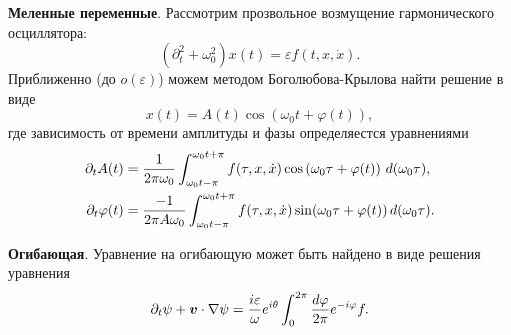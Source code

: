 \textbf{Меленные переменные}. Рассмотрим прозвольное возмущение гармонического осциллятора:
\begin{equation}
    \left(\partial_t^2 + \omega_0^2\right) x(t) = \varepsilon f(t, x, \dot{x}).
    \label{sloweq}
\end{equation}
Приближенно (до $o(\varepsilon)$) можем методом Боголюбова-Крылова найти
решение в виде
\begin{equation}
    x(t) = A(t) \cos(\omega_0 t + \varphi(t)),
    \label{sloweqview}
\end{equation}
где зависимость от времени амплитуды и фазы определяестся уравнениями
\begin{align}
    \partial_t A(t) &= \frac{1}{2\pi \omega_0}\int_{\omega_0 t-\pi}^{\omega_0 t+\pi} f(\tau, x, \dot{x}) \cos\left(\omega_0 \tau + \varphi(t)\right) \, d (\omega_0\tau), 
    \label{slowA}
    \\
    \partial_t \varphi(t) &= \frac{-1}{2 \pi A \omega_0} \int_{\omega_0 t-\pi}^{\omega_0 t + \pi} f(\tau, x, \dot{x}) \sin(\omega_0 \tau + \varphi(t)) \, d (\omega_0 \tau).
    \label{slowphi}
\end{align}

\textbf{Огибающая}. Уравнение на огибающую может быть найдено в виде решения уравнения
\begin{equation*}
    \partial_t \psi + \mbox{\boldmath $v$} \cdot \nabla \psi = \frac{i \varepsilon}{\omega} e^{i \theta} \int_{0}^{2\pi} \frac{d \varphi}{2 \pi} e^{-i \varphi} f.
\end{equation*}